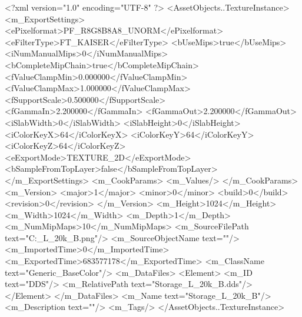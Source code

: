 <?xml version="1.0" encoding="UTF-8" ?>
<AssetObjects..TextureInstance>
	<m_ExportSettings>
		<ePixelformat>PF_R8G8B8A8_UNORM</ePixelformat>
		<eFilterType>FT_KAISER</eFilterType>
		<bUseMips>true</bUseMips>
		<iNumManualMips>0</iNumManualMips>
		<bCompleteMipChain>true</bCompleteMipChain>
		<fValueClampMin>0.000000</fValueClampMin>
		<fValueClampMax>1.000000</fValueClampMax>
		<fSupportScale>0.500000</fSupportScale>
		<fGammaIn>2.200000</fGammaIn>
		<fGammaOut>2.200000</fGammaOut>
		<iSlabWidth>0</iSlabWidth>
		<iSlabHeight>0</iSlabHeight>
		<iColorKeyX>64</iColorKeyX>
		<iColorKeyY>64</iColorKeyY>
		<iColorKeyZ>64</iColorKeyZ>
		<eExportMode>TEXTURE_2D</eExportMode>
		<bSampleFromTopLayer>false</bSampleFromTopLayer>
	</m_ExportSettings>
	<m_CookParams>
		<m_Values/>
	</m_CookParams>
	<m_Version>
		<major>1</major>
		<minor>0</minor>
		<build>0</build>
		<revision>0</revision>
	</m_Version>
	<m_Height>1024</m_Height>
	<m_Width>1024</m_Width>
	<m_Depth>1</m_Depth>
	<m_NumMipMaps>10</m_NumMipMaps>
	<m_SourceFilePath text="C:\Users\Shadow\Desktop\Prototypes\Storage_L_20k_B.png"/>
	<m_SourceObjectName text=""/>
	<m_ImportedTime>0</m_ImportedTime>
	<m_ExportedTime>683577178</m_ExportedTime>
	<m_ClassName text="Generic_BaseColor"/>
	<m_DataFiles>
		<Element>
			<m_ID text="DDS"/>
			<m_RelativePath text="Storage_L_20k_B.dds"/>
		</Element>
	</m_DataFiles>
	<m_Name text="Storage_L_20k_B"/>
	<m_Description text=""/>
	<m_Tags/>
</AssetObjects..TextureInstance>

